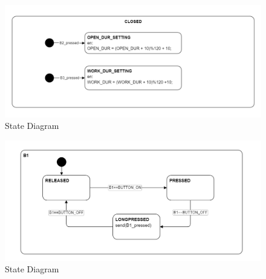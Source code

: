 \documentclass[12pt]{article}
\begin{document}
\begin{figure}[h] %
    \centering %
    \includegraphics[width=1\textwidth]{state_diagram1.png} %
    \caption{State Diagram} %
    \label{fig:CLOSED State} %
\end{figure}

\begin{figure}[h] %
    \centering %
    \includegraphics[width=1\textwidth]{state_diagram2.png} %
    \caption{State Diagram} %
    \label{fig:Button State} %
\end{figure}
\newpage
{}
\listoffigures
\end{document}
